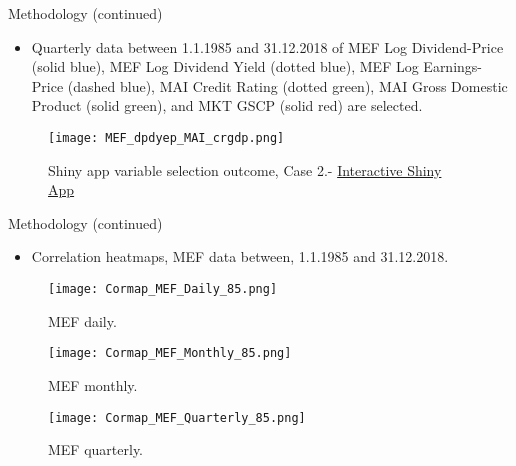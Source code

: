 \documentclass{beamer}
\begin{document}
\begin{frame}{Methodology (continued)}
  \begin{itemize}
    \item Quarterly data between 1.1.1985 and 31.12.2018 of MEF Log Dividend-Price (solid blue), MEF Log Dividend Yield (dotted blue), MEF Log Earnings-Price (dashed blue), MAI Credit Rating (dotted green), MAI Gross Domestic Product (solid green), and MKT GSCP (solid red) are selected.
  \end{itemize}
    \begin{figure}[H]
        \centering
        \begin{minipage}{.80\textwidth}
            \centering
            \texttt{[image: MEF\_dpdyep\_MAI\_crgdp.png]}
            \caption{Shiny app variable selection outcome, Case 2.- \href{https://baumender11.shinyapps.io/Alpha/}{Interactive Shiny App}}
            \label{fig:linear_prediction}
        \end{minipage}
    \end{figure}
\end{frame}

\begin{frame}{Methodology (continued)}
  \begin{itemize}
    \item{ Correlation heatmaps, MEF data between, 1.1.1985 and 31.12.2018.} 
  \end{itemize}

  \begin{figure}[H]
    \centering
    \begin{minipage}{0.32\textwidth}
      \centering
      \texttt{[image: Cormap\_MEF\_Daily\_85.png]}
      \caption{MEF daily.}
      \label{fig:linear_prediction}
    \end{minipage}\hfill
    \begin{minipage}{0.32\textwidth}
      \centering
      \texttt{[image: Cormap\_MEF\_Monthly\_85.png]}
      \caption{MEF monthly.}
      \label{fig:nn_prediction}
    \end{minipage}\hfill
    \begin{minipage}{0.32\textwidth}
      \centering
      \texttt{[image: Cormap\_MEF\_Quarterly\_85.png]} 
      \caption{MEF quarterly.}
      \label{fig:third_prediction}
    \end{minipage}
  \end{figure}
\end{frame}
\end{document}
